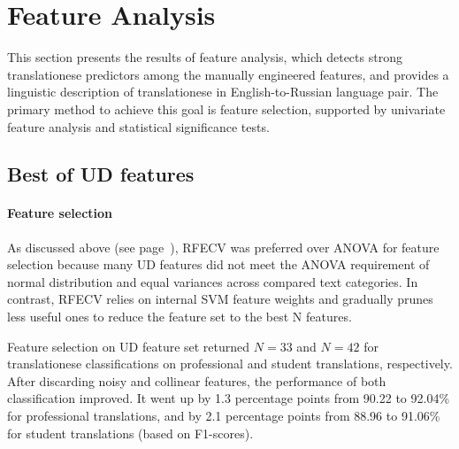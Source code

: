 \section{\label{sec:bestof}Feature Analysis}
This section presents the results of feature analysis, which detects strong translationese predictors among the manually engineered features, and provides a linguistic description of translationese in English-to-Russian language pair.
The primary method to achieve this goal is feature selection, supported by univariate feature analysis and statistical significance tests.


\subsection{\label{ssec:best_ud}Best of UD features}

\paragraph{\label{par:detect_select}Feature selection}
As discussed above (see page~\pageref{par:featanal_meths}), \gls{RFECV} was preferred over \gls{ANOVA} for feature selection because many UD features did not meet the ANOVA requirement of normal distribution and equal variances across compared text categories. In contrast, RFECV relies on internal SVM feature weights and gradually prunes less useful ones to reduce the feature set to the best N features. 


Feature selection on UD feature set returned $N=33$ and $N=42$ for translationese classifications on professional and student translations, respectively. 
After discarding noisy and collinear features, the performance of both classification improved. It went up by 1.3 percentage points from 90.22 to 92.04\% for professional translations, and by 2.1 percentage points from 88.96 to 91.06\% for student translations (based on F1-scores). %

